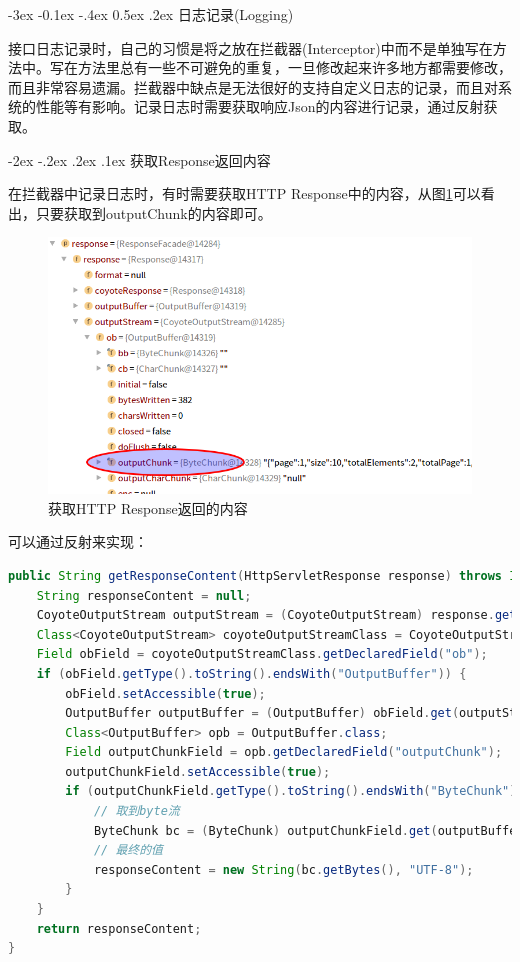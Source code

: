 \documentclass[11pt,fleqn]{book}
\makeatletter
\numberwithin{dummy}{section}
\theoremstyle{ocrenumbox}
\theoremstyle{blacknumex}
\theoremstyle{blacknumbox}
\theoremstyle{ocrenum}
\renewcommand{\subsection}{\@startsection {subsection}{2}{\z@}
	{-3ex \@plus -0.1ex \@minus -.4ex}
	{0.5ex \@plus.2ex }
	{\normalfont\sffamily\bfseries}}
\renewcommand\paragraph{\@startsection{paragraph}{4}{\z@}
	{-2ex \@plus-.2ex \@minus .2ex}
	{.1ex}
	{\normalfont\small\sffamily\bfseries}}
\newlength\esp
\makeatother
\begin{document}
\subsection{日志记录(Logging)}

接口日志记录时，自己的习惯是将之放在拦截器(Interceptor)中而不是单独写在方法中。写在方法里总有一些不可避免的重复，一旦修改起来许多地方都需要修改，而且非常容易遗漏。拦截器中缺点是无法很好的支持自定义日志的记录，而且对系统的性能等有影响。记录日志时需要获取响应Json的内容进行记录，通过反射获取。

\paragraph{获取Response返回内容}

在拦截器中记录日志时，有时需要获取HTTP Response中的内容，从图\ref{fig:outputchunkcontent}可以看出，只要获取到outputChunk的内容即可。

\begin{figure}[htbp]
	\centering
	\includegraphics[scale=0.5]{outputchunkcontent.png}
	\caption{获取HTTP Response返回的内容}
	\label{fig:outputchunkcontent}
\end{figure}


可以通过反射来实现：

\begin{lstlisting}[language=Java]
public String getResponseContent(HttpServletResponse response) throws IOException, NoSuchFieldException, IllegalAccessException {
	String responseContent = null;
	CoyoteOutputStream outputStream = (CoyoteOutputStream) response.getOutputStream();
	Class<CoyoteOutputStream> coyoteOutputStreamClass = CoyoteOutputStream.class;
	Field obField = coyoteOutputStreamClass.getDeclaredField("ob");
	if (obField.getType().toString().endsWith("OutputBuffer")) {
		obField.setAccessible(true);
		OutputBuffer outputBuffer = (OutputBuffer) obField.get(outputStream);
		Class<OutputBuffer> opb = OutputBuffer.class;
		Field outputChunkField = opb.getDeclaredField("outputChunk");
		outputChunkField.setAccessible(true);
		if (outputChunkField.getType().toString().endsWith("ByteChunk")) {
			// 取到byte流
			ByteChunk bc = (ByteChunk) outputChunkField.get(outputBuffer);
			// 最终的值
			responseContent = new String(bc.getBytes(), "UTF-8");
		}
	}
	return responseContent;
}
\end{lstlisting}
\end{document}
